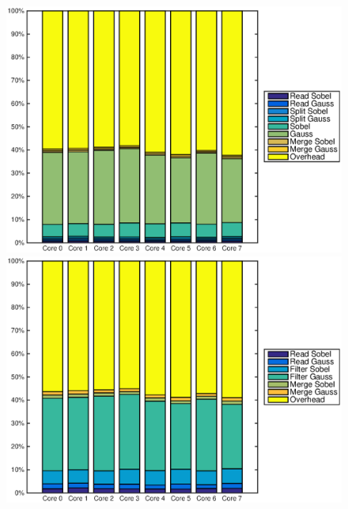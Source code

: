 \begin{figure}
    \centering
    \begin{minipage}{0.45\textwidth}
        \centering
        \includegraphics[width=0.99\linewidth]{images/openem_cifcif_2initial_func.eps}
    \end{minipage}
    \hfill
    \begin{minipage}{0.45\textwidth}
        \centering
        \includegraphics[width=0.99\linewidth]{images/openem_cifcif_2initial_eo.eps}
    \end{minipage}%
\end{figure}

